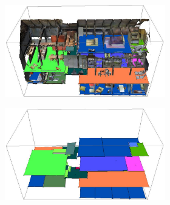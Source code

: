 \begin{figure}[h!]
	\centering
	\begin{subfigure}[b]{\linewidth}
		\centering
		\begin{subfigure}[b]{0.48\linewidth}
			\centering
			\includegraphics[width=\textwidth]{images/matterport_surfaces_by_label.pdf}
		\end{subfigure}
		\hfil
		\begin{subfigure}[b]{0.48\linewidth}
			\centering
			\includegraphics[width=\textwidth]{images/surfaces_by_label.pdf}
			

\end{subfigure}
\end{subfigure}
\end{figure}
